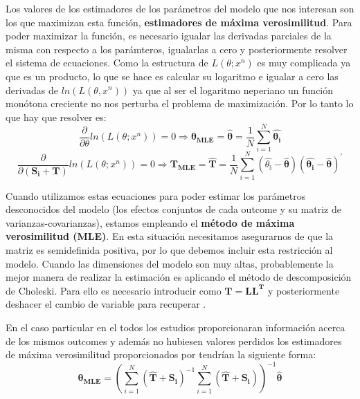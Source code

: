 \documentclass[a4paper,openright,12pt]{report}
\begin{document}
Los valores de los estimadores de los parámetros del modelo que nos interesan son los que maximizan esta función, \textbf{estimadores de máxima verosimilitud}. Para poder maximizar la función, es necesario igualar las derivadas parciales de la misma con respecto a los parámteros, igualarlas a cero y posteriormente resolver el sistema de ecuaciones. Como la estructura de $L(\theta;x^{n})$ es muy complicada ya que es un producto, lo que se hace es calcular su logaritmo e igualar a cero las derivadas de $ln(L(\theta,x^{n}))$ ya que al ser el logaritmo neperiano un función monótona creciente no nos perturba el problema de maximización. Por lo tanto lo que hay que resolver es: 
\begin{equation}
\frac{\partial}{\partial\mathbb{\theta}}ln(L(\theta;x^{n}))=0 \Rightarrow \mathbf{\theta_{MLE}}=\mathbf{\widehat{\theta}}=\frac{1}{N}\sum_{i=1}^{N}\mathbf{\widehat{\theta_{i}}}
\label{der_respecto_mu}
\end{equation}
\begin{equation}
\frac{\partial}{\partial\mathbf{(S_{i}+T)}}ln(L(\theta;x^{n}))=0 \Rightarrow \mathbf{T_{MLE}}=\mathbf{\widehat{T}}=\frac{1}{N}\sum_{i=1}^{N}(\mathbb{\widehat{\theta_{i}}}-\mathbf{\widehat{\theta}})(\mathbf{\widehat{\theta_{i}}}-\mathbf{\widehat{\theta}})^{'}
\label{der_respecto_sigma}
\end{equation}

Cuando utilizamos estas ecuaciones para poder estimar los parámetros desconocidos del modelo (los efectos conjuntos de cada outcome y su matriz de varianzas-covarianzas), estamos empleando el \textbf{método de máxima verosimilitud (MLE)}. En esta situación necesitamos asegurarnos de que la matriz  es semidefinida positiva, por lo que debemos incluir esta restricción al modelo. Cuando las dimensiones del modelo son muy altas, probablemente la mejor manera de realizar la estimación es aplicando el método de descomposición de Choleski. Para ello es necesario introducir  como $\mathbf{T}=\mathbf{L}\mathbf{L^{T}}$ y posteriormente deshacer el cambio de variable para recuperar  \cite{Jackson2011}.

En el caso particular en el todos los estudios proporcionaran información acerca de los mismos outcomes y además no hubiesen valores perdidos los estimadores de máxima verosimilitud proporcionados por \cite{Mavridis2011} tendrían la siguiente forma:
\begin{equation}
\mathbf{\theta_{MLE}}=(\sum_{i=1}^{N}(\mathbf{\widehat{T}+S_{i}})^{-1}\sum_{i=1}^{N}(\mathbf{\widehat{T}+S_{i}}))^{-1}\mathbf{\widehat{\theta}}
\label{mle_theta_mavridis}
\end{equation}
\end{document}
